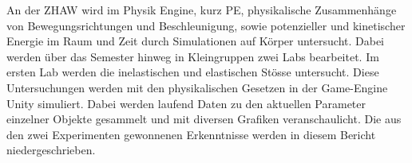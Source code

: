 \documentclass[../main.tex]{subfiles}
\begin{document}
An der ZHAW wird im Physik Engine, kurz PE, physikalische Zusammenhänge
von Bewegungsrichtungen und Beschleunigung, sowie potenzieller und kinetischer Energie im Raum und Zeit
durch Simulationen auf Körper untersucht. Dabei werden über das Semester hinweg in Kleingruppen
zwei Labs bearbeitet.
\newline
\newline
Im ersten Lab werden die inelastischen und elastischen Stösse untersucht.
\newline
\newline
Diese Untersuchungen werden mit den physikalischen Gesetzen in der Game-Engine Unity simuliert.
Dabei werden laufend Daten zu den aktuellen Parameter einzelner Objekte gesammelt und mit diversen
Grafiken veranschaulicht. Die aus den zwei Experimenten gewonnenen Erkenntnisse werden in diesem Bericht
niedergeschrieben.
\end{document}
